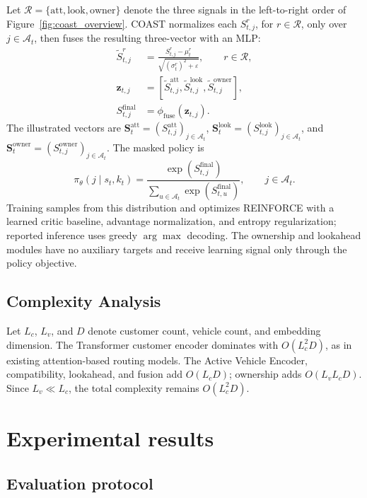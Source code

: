 \documentclass[letterpaper]{article}
\begin{document}
Let $\mathcal R=\{\mathrm{att},\mathrm{look},\mathrm{owner}\}$ denote the three signals in the left-to-right order of Figure~\ref{fig:coast_overview}. COAST normalizes each $S_{t,j}^{r}$, for $r\in\mathcal R$, only over $j\in\mathcal A_t$, then fuses the resulting three-vector with an MLP:
\[
\begin{aligned}
\widetilde S_{t,j}^{r}&=\frac{S_{t,j}^{r}-\mu_t^{r}}
{\sqrt{(\sigma_t^{r})^2+\varepsilon}},\qquad r\in\mathcal R,\\
\mathbf z_{t,j}&=[\widetilde S_{t,j}^{\mathrm{att}},
\widetilde S_{t,j}^{\mathrm{look}},\widetilde S_{t,j}^{\mathrm{owner}}],\\
S_{t,j}^{\mathrm{final}}&=\phi_{\mathrm{fuse}}(\mathbf z_{t,j}).
\end{aligned}
\]
The illustrated vectors are $\mathbf S_t^{\mathrm{att}}=(S_{t,j}^{\mathrm{att}})_{j\in\mathcal A_t}$, $\mathbf S_t^{\mathrm{look}}=(S_{t,j}^{\mathrm{look}})_{j\in\mathcal A_t}$, and $\mathbf S_t^{\mathrm{owner}}=(S_{t,j}^{\mathrm{owner}})_{j\in\mathcal A_t}$. The masked policy is
\[
\pi_\theta(j\mid s_t,k_t)=
\frac{\exp(S_{t,j}^{\mathrm{final}})}
{\sum_{u\in\mathcal A_t}\exp(S_{t,u}^{\mathrm{final}})},\qquad j\in\mathcal A_t.
\]
Training samples from this distribution and optimizes REINFORCE \cite{williams1992simple} with a learned critic baseline, advantage normalization, and entropy regularization; reported inference uses greedy $\arg\max$ decoding. The ownership and lookahead modules have no auxiliary targets and receive learning signal only through the policy objective.
\subsection{Complexity Analysis}

Let $L_c$, $L_v$, and $D$ denote customer count, vehicle count, and embedding dimension. The Transformer customer encoder dominates with $O(L_c^2D)$, as in existing attention-based routing models. The Active Vehicle Encoder, compatibility, lookahead, and fusion add $O(L_cD)$; ownership adds $O(L_vL_cD)$. Since $L_v \ll L_c$, the total complexity remains $O(L_c^2D)$.

\section{Experimental results} \label{sec:experiment}

\subsection{Evaluation protocol}
\end{document}
